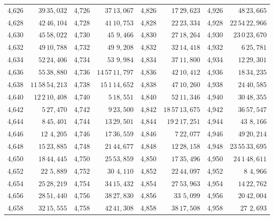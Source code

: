 \begin{tabular}{|r|r||r|r||r|r||r|r|}
4,626 & \(39\,35,\!032\) & 4,726 & \(37\,13,\!067\) & 4,826 & \(17\,29,\!623\) & 4,926 & \(48\,23,\!665\) \\
4,628 & \(42\,46,\!104\) & 4,728 & \(41\,10,\!753\) & 4,828 & \(22\,23,\!334\) & 4,928 & \(22\,54\,22,\!966\) \\[1pt]
4,630 & \(45\,58,\!022\) & 4,730 & \(45\,\,9,\!466\) & 4,830 & \(27\,18,\!264\) & 4,930 & \(23\,0\,23,\!670\) \\[1pt]
4,632 & \(49\,10,\!788\) & 4,732 & \(49\,\,9,\!208\) & 4,832 & \(32\,14,\!418\) & 4,932 & \(6\,25,\!781\) \\
4,634 & \(52\,24,\!406\) & 4,734 & \(53\,\,9,\!984\) & 4,834 & \(37\,11,\!800\) & 4,934 & \(12\,29,\!301\) \\
4,636 & \(55\,38,\!880\) & 4,736 & \(14\,57\,11,\!797\) & 4,836 & \(42\,10,\!412\) & 4,936 & \(18\,34,\!235\) \\
4,638 & \(11\,58\,54,\!213\) & 4,738 & \(15\,1\,14,\!652\) & 4,838 & \(47\,10,\!260\) & 4,938 & \(24\,40,\!585\) \\[1pt]
4,640 & \(12\,2\,10,\!408\) & 4,740 & \(5\,18,\!551\) & 4,840 & \(52\,11,\!346\) & 4,940 & \(30\,48,\!355\) \\[1pt]
4,642 & \(5\,27,\!470\) & 4,742 & \(9\,23,\!500\) & 4,842 & \(18\,57\,13,\!675\) & 4,942 & \(36\,57,\!547\) \\
4,644 & \(8\,45,\!401\) & 4,744 & \(13\,29,\!501\) & 4,844 & \(19\,2\,17,\!251\) & 4,944 & \(43\,\,8,\!166\) \\
4,646 & \(12\,\,4,\!205\) & 4,746 & \(17\,36,\!559\) & 4,846 & \(7\,22,\!077\) & 4,946 & \(49\,20,\!214\) \\
4,648 & \(15\,23,\!885\) & 4,748 & \(21\,44,\!677\) & 4,848 & \(12\,28,\!158\) & 4,948 & \(23\,55\,33,\!695\) \\[1pt]
4,650 & \(18\,44,\!445\) & 4,750 & \(25\,53,\!859\) & 4,850 & \(17\,35,\!496\) & 4,950 & \(24\,1\,48,\!611\) \\[1pt]
4,652 & \(22\,\,5,\!889\) & 4,752 & \(30\,\,4,\!110\) & 4,852 & \(22\,44,\!097\) & 4,952 & \(8\,\,4,\!966\) \\
4,654 & \(25\,28,\!219\) & 4,754 & \(34\,15,\!432\) & 4,854 & \(27\,53,\!963\) & 4,954 & \(14\,22,\!762\) \\
4,656 & \(28\,51,\!440\) & 4,756 & \(38\,27,\!830\) & 4,856 & \(33\,\,5,\!099\) & 4,956 & \(20\,42,\!004\) \\
4,658 & \(32\,15,\!555\) & 4,758 & \(42\,41,\!308\) & 4,858 & \(38\,17,\!508\) & 4,958 & \(27\,\,2,\!693\) \\[1pt]

\end{tabular}
